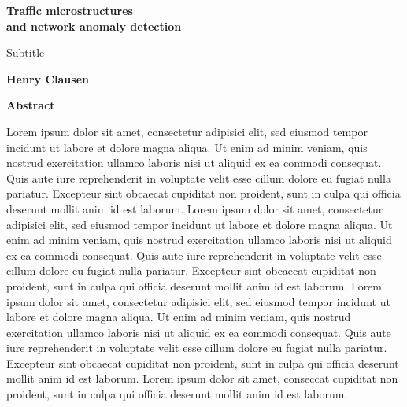 \thispagestyle{plain}
\begin{center}
    \Large
    \textbf{Traffic microstructures\\ and network anomaly detection }
        
    \vspace{0.4cm}
    \large
Subtitle
        
    \vspace{0.4cm}
    \textbf{Henry Clausen}
       
    \vspace{0.9cm}
    \textbf{Abstract}
\end{center}
Lorem ipsum dolor sit amet, consectetur adipisici elit, sed eiusmod tempor incidunt ut labore et dolore magna aliqua. Ut enim ad minim veniam, quis nostrud exercitation ullamco laboris nisi ut aliquid ex ea commodi consequat. Quis aute iure reprehenderit in voluptate velit esse cillum dolore eu fugiat nulla pariatur. Excepteur sint obcaecat cupiditat non proident, sunt in culpa qui officia deserunt mollit anim id est laborum. Lorem ipsum dolor sit amet, consectetur adipisici elit, sed eiusmod tempor incidunt ut labore et dolore magna aliqua. Ut enim ad minim veniam, quis nostrud exercitation ullamco laboris nisi ut aliquid ex ea commodi consequat. Quis aute iure reprehenderit in voluptate velit esse cillum dolore eu fugiat nulla pariatur. Excepteur sint obcaecat cupiditat non proident, sunt in culpa qui officia deserunt mollit anim id est laborum. Lorem ipsum dolor sit amet, consectetur adipisici elit, sed eiusmod tempor incidunt ut labore et dolore magna aliqua. Ut enim ad minim veniam, quis nostrud exercitation ullamco laboris nisi ut aliquid ex ea commodi consequat. Quis aute iure reprehenderit in voluptate velit esse cillum dolore eu fugiat nulla pariatur. Excepteur sint obcaecat cupiditat non proident, sunt in culpa qui officia deserunt mollit anim id est laborum. Lorem ipsum dolor sit amet, conseccat cupiditat non proident, sunt in culpa qui officia deserunt mollit anim id est laborum. 

       \vfill
{}
